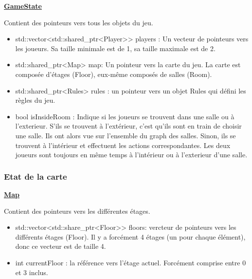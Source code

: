 \underline{\textbf{GameState}}
\par Contient des pointeurs vers tous les objets du jeu.
\begin{itemize}
    \item std::vector<std::shared\_ptr<Player>> players : Un vecteur de pointeurs vers les joueurs. Sa taille minimale est de 1, sa taille maximale est de 2.
    \item std::shared\_ptr<Map> map: Un pointeur vers la carte du jeu. La carte est composée d'étages (Floor), eux-même composés de salles (Room).
    \item std::shared\_ptr<Rules> rules : un pointeur vers un objet Rules qui défini les règles du jeu.
    \item  bool isInsideRoom : Indique si les joueurs se trouvent dans une salle ou  à l'exterieur. S'ils se trouvent à l'extérieur, c'est qu'ils sont en train de choisir une salle. Ils ont alors vue sur l'ensemble du graph des salles. Sinon, ils se trouvent à l'intérieur et effectuent les actions correspondantes. Les deux joueurs sont toujours en même temps à l'intérieur ou à l'exterieur d'une salle.
\end{itemize}

\subsubsection{Etat de la carte}
\underline{\textbf{Map}}
\par Contient des pointeurs vers les différentes étages.
\begin{itemize}
    \item std::vector<std::share\_ptr<Floor>> floors: vercteur de pointeurs vers les différents étages (Floor). Il y a forcément 4 étages (un pour chaque élément), donc ce vecteur est de taille 4.
    \item int currentFloor : la référence vers l'étage actuel. Forcément comprise entre 0 et 3 inclus.
\end{itemize}

